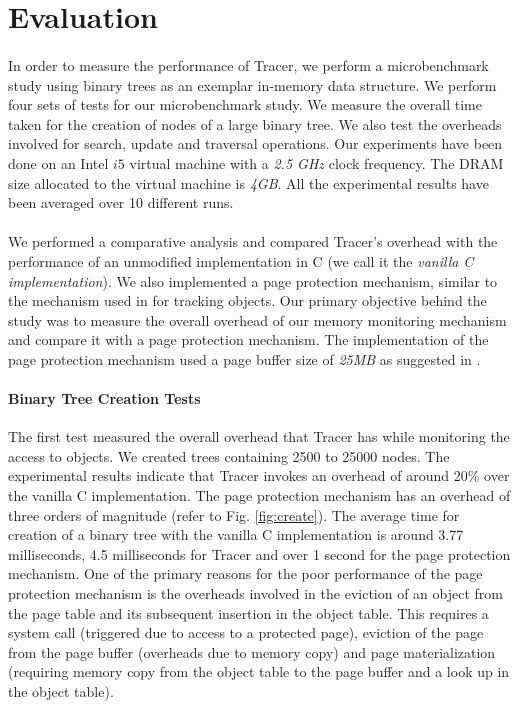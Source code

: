 \section{Evaluation}
\label{sec:eval}
\paragraph{}
In order to measure the performance of Tracer, we perform a microbenchmark study using binary trees as an exemplar in-memory data structure. We perform four sets of tests for our microbenchmark study. We measure the overall time taken for the creation of nodes of a large binary tree. We also test the overheads involved for search, update and traversal operations. Our experiments have been done on an Intel $i5$ virtual machine with a {\emph{2.5 GHz}} clock frequency. The DRAM size allocated to the virtual machine is {\emph{4GB}}. All the experimental results have been averaged over 10 different runs. 

\paragraph{}
We performed a comparative analysis and compared Tracer's overhead with the performance of an unmodified implementation in C (we call it the {\emph{vanilla C implementation}}). We also implemented a page protection mechanism, similar to the mechanism used in \cite{SSDAlloc} for tracking objects. Our primary objective behind the study was to measure the overall overhead of our memory monitoring mechanism and compare it with a page protection mechanism. The implementation of the page protection mechanism used a page buffer size of {\emph{25MB}} as suggested in \cite{SSDAlloc}.

\paragraph{Binary Tree Creation Tests}
The first test measured the overall overhead that Tracer has while monitoring the access to objects. We created trees containing 2500 to 25000 nodes. The experimental results indicate that Tracer invokes an overhead of around 20\% over the vanilla C implementation. The page protection mechanism has an overhead of three orders of magnitude (refer to Fig. \ref{fig:create}). The average time for creation of a binary tree with the vanilla C implementation is around 3.77 milliseconds, 4.5 milliseconds for Tracer and over 1 second for the page protection mechanism. One of the primary reasons for the poor performance of the page protection mechanism is the overheads involved in the eviction of an object from the page table and its subsequent insertion in the object table. This requires a system call (triggered due to access to a protected page), eviction of the page from the page buffer (overheads due to memory copy) and page materialization (requiring memory copy from the object table to the page buffer and a look up in the object table). 


